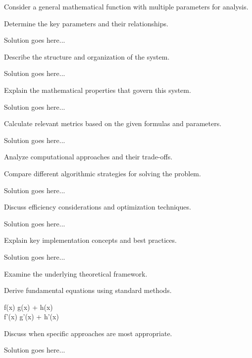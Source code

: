 \documentclass[partnumbering]{../homework}
\begin{document}


Consider a general mathematical function with multiple parameters for analysis.

Determine the key parameters and their relationships.

Solution goes here...

Describe the structure and organization of the system.

Solution goes here...

Explain the mathematical properties that govern this system.

Solution goes here...


Calculate relevant metrics based on the given formulas and parameters.

Solution goes here...


Analyze computational approaches and their trade-offs.

Compare different algorithmic strategies for solving the problem.

Solution goes here...

Discuss efficiency considerations and optimization techniques.

Solution goes here...


Explain key implementation concepts and best practices.

Solution goes here...


Examine the underlying theoretical framework.

Derive fundamental equations using standard methods.

\begin{hwmath}
f(x) \eq g(x) + h(x) \\
f'(x) \eq g'(x) + h'(x)
\end{hwmath}

Discuss when specific approaches are most appropriate.

Solution goes here...
\end{document}
